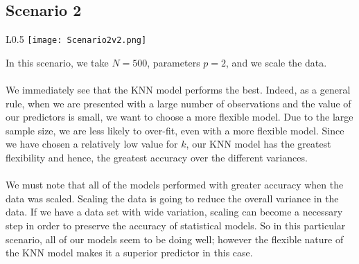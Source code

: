 \documentclass[11pt, oneside]{article}
\begin{document}
\subsection*{Scenario 2}
\begin{wrapfigure}[]{L}{0.5\textwidth}
\vspace{-0.55cm}
\texttt{[image: Scenario2v2.png]}
\vspace{-.25cm}
\end{wrapfigure}
In this scenario, we take $N=500$, parameters $p=2$, and we scale the data.\\
\\
We immediately see that the KNN model performs the best. Indeed, as a general rule, when we are presented with a large number of observations and the value of our predictors is small, we want to choose a more flexible model. Due to the large sample size, we are less likely to over-fit, even with a more flexible model. Since we have chosen a relatively low value for $k$, our KNN model has the greatest flexibility and hence, the greatest accuracy over the different variances.\\
\\
We must note that all of the models performed with greater accuracy when the data was scaled. Scaling the data is going to reduce the overall variance in the data. If we have a data set with wide variation, scaling can become a necessary step in order to preserve the accuracy of statistical models. So in this particular scenario, all of our models seem to be doing well; however the flexible nature of the KNN model makes it a superior predictor in this case.




\end{document}
